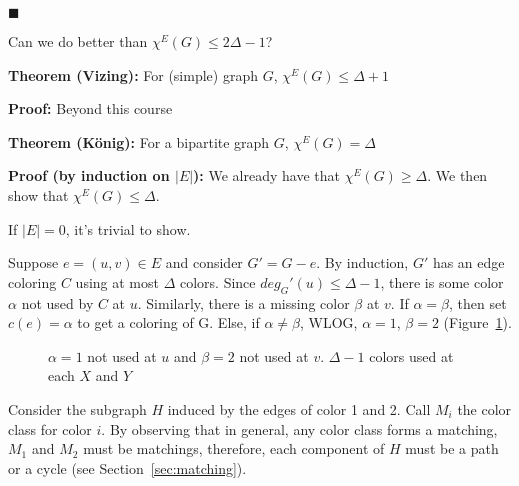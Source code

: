 \documentclass[11pt, letterpaper, oneside]{article}
\begin{document}
{\hfill $\blacksquare$}

Can we do better than $\chi^E(G) \leq 2\Delta-1$?

\textbf{Theorem (Vizing):} For (simple) graph $G$, $\chi^E(G) \leq \Delta+1$

\textbf{Proof:} Beyond this course

\textbf{Theorem (K\"{o}nig):} For a bipartite graph $G$, $\chi^E(G) = \Delta$

\textbf{Proof (by induction on $|E|$):} We already have that $\chi^E(G) \geq \Delta$. We then show that $\chi^E(G) \leq \Delta$. 

If $|E|=0$, it's trivial to show.

Suppose $e=(u,v) \in E$ and consider $G'=G-e$. By induction, $G'$ has an edge coloring $C$ using at most $\Delta$ colors. Since $deg_G'(u) \leq \Delta-1$, there is some color $\alpha$ not used by $C$ at $u$. Similarly, there is a missing color $\beta$ at $v$. If $\alpha=\beta$, then set $c(e)=\alpha$ to get a coloring of G. Else, if $\alpha \ne \beta$, WLOG, $\alpha=1$, $\beta=2$ (Figure~\ref{konig_coloring}).

\begin{figure}[H]
	\centering
	\caption{$\alpha=1$ not used at $u$ and $\beta=2$ not used at $v$. $\Delta-1$ colors used at each $X$ and $Y$}
	\label{konig_coloring}
\end{figure}

Consider the subgraph $H$ induced by the edges of color 1 and 2. Call $M_i$ the color class for color $i$. By observing that in general, any color class forms a matching, $M_1$ and $M_2$ must be matchings, therefore, each component of $H$ must be a path or a cycle (see Section~\ref{sec:matching}).
\end{document}
